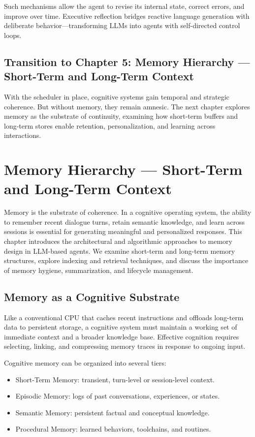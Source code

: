 \documentclass{book}
\begin{document}
Such mechanisms allow the agent to revise its internal state, correct errors, and improve over time. Executive reflection bridges reactive language generation with deliberate behavior—transforming LLMs into agents with self-directed control loops.

\section*{Transition to Chapter 5: Memory Hierarchy — Short-Term and Long-Term Context}

With the scheduler in place, cognitive systems gain temporal and strategic coherence. But without memory, they remain amnesic. The next chapter explores memory as the substrate of continuity, examining how short-term buffers and long-term stores enable retention, personalization, and learning across interactions.

\chapter{Memory Hierarchy — Short-Term and Long-Term Context}

Memory is the substrate of coherence. In a cognitive operating system, the ability to remember recent dialogue turns, retain semantic knowledge, and learn across sessions is essential for generating meaningful and personalized responses. This chapter introduces the architectural and algorithmic approaches to memory design in LLM-based agents. We examine short-term and long-term memory structures, explore indexing and retrieval techniques, and discuss the importance of memory hygiene, summarization, and lifecycle management.

\section{Memory as a Cognitive Substrate}

Like a conventional CPU that caches recent instructions and offloads long-term data to persistent storage, a cognitive system must maintain a working set of immediate context and a broader knowledge base. Effective cognition requires selecting, linking, and compressing memory traces in response to ongoing input.

Cognitive memory can be organized into several tiers:
\begin{itemize}
  \item Short-Term Memory: transient, turn-level or session-level context.
  \item Episodic Memory: logs of past conversations, experiences, or states.
  \item Semantic Memory: persistent factual and conceptual knowledge.
  \item Procedural Memory: learned behaviors, toolchains, and routines.
\end{itemize}
\end{document}
